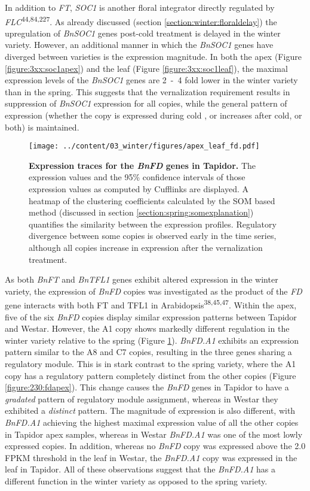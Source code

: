 \documentclass[12pt,]{book}
\begin{document}
In addition to \emph{FT}, \emph{SOC1} is another floral integrator
directly regulated by \emph{FLC}\textsuperscript{44,84,227}. As already
discussed (section \ref{section:winter:floraldelay}) the upregulation of
\emph{BnSOC1} genes post-cold treatment is delayed in the winter
variety. However, an additional manner in which the \emph{BnSOC1} genes
have diverged between varieties is the expression magnitude. In both the
apex (Figure \ref{figure:3xx:soc1apex}) and the leaf (Figure
\ref{figure:3xx:soc1leaf}), the maximal expression levels of the
\emph{BnSOC1} genes are 2~-~4 fold lower in the winter variety than in
the spring. This suggests that the vernalization requirement results in
suppression of \emph{BnSOC1} expression for all copies, while the
general pattern of expression (whether the copy is expressed during cold
, or increases after cold, or both) is maintained.

\begin{figure}[htbp]
\centering
\texttt{[image: ../content/03\_winter/figures/apex\_leaf\_fd.pdf]}
\caption{\textbf{Expression traces for the \emph{BnFD} genes in
Tapidor.} The expression values and the 95\% confidence intervals of
those expression values as computed by Cufflinks are displayed. A
heatmap of the clustering coefficients calculated by the SOM based
method (discussed in section \ref{section:spring:somexplanation})
quantifies the similarity between the expression profiles. Regulatory
divergence between some copies is observed early in the time series,
although all copies increase in expression after the vernalization
treatment.}\label{figure:3xx:fdleafapex}
\end{figure}

As both \emph{BnFT} and \emph{BnTFL1} genes exhibit altered expression
in the winter variety, the expression of \emph{BnFD} copies was
investigated as the product of the \emph{FD} gene interacts with both FT
and TFL1 in Arabidopsis\textsuperscript{38,45,47}. Within the apex, five
of the six \emph{BnFD} copies display similar expression patterns
between Tapidor and Westar. However, the A1 copy shows markedly
different regulation in the winter variety relative to the spring
(Figure \ref{figure:3xx:fdleafapex}). \emph{BnFD.A1} exhibits an
expression pattern similar to the A8 and C7 copies, resulting in the
three genes sharing a regulatory module. This is in stark contrast to
the spring variety, where the A1 copy has a regulatory pattern
completely distinct from the other copies (Figure
\ref{figure:230:fdapex}). This change causes the \emph{BnFD} genes in
Tapidor to have a \emph{gradated} pattern of regulatory module
assignment, whereas in Westar they exhibited a \emph{distinct} pattern.
The magnitude of expression is also different, with \emph{BnFD.A1}
achieving the highest maximal expression value of all the other copies
in Tapidor apex samples, whereas in Westar \emph{BnFD.A1} was one of the
most lowly expressed copies. In addition, whereas no \emph{BnFD} copy
was expressed above the 2.0 FPKM threshold in the leaf in Westar, the
\emph{BnFD.A1} copy was expressed in the leaf in Tapidor. All of these
observations suggest that the \emph{BnFD.A1} has a different function in
the winter variety as opposed to the spring variety.
\end{document}
